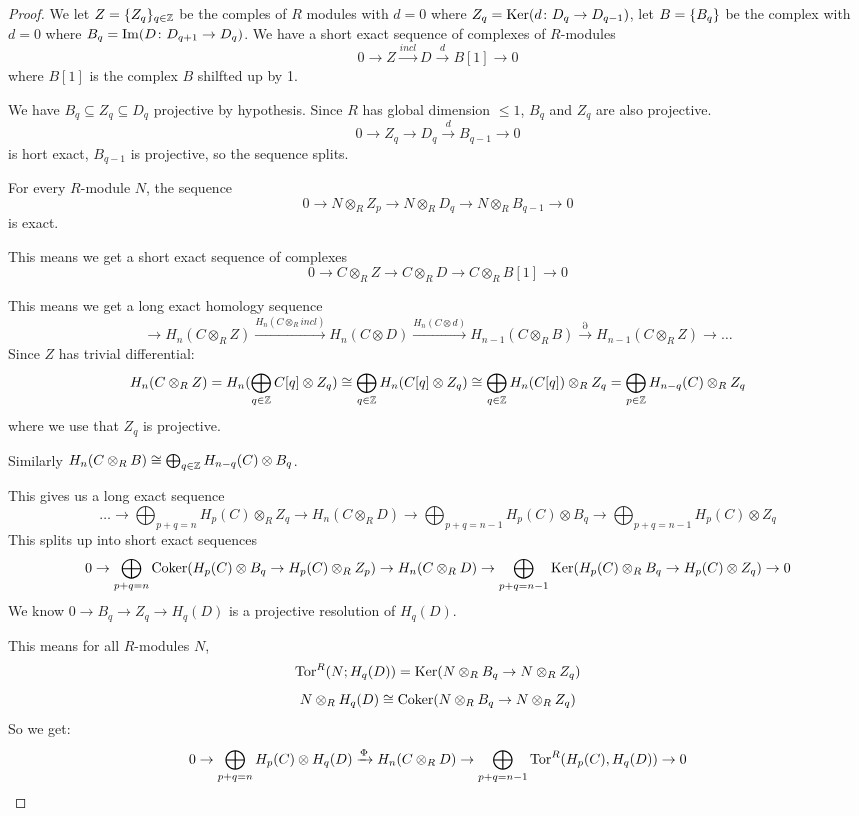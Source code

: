 \documentclass[language=english]{TemplateLecture}
\begin{document}
\begin{proof}
    We let \(Z = \{Z_q\}_{q\in \mathbb{Z}}\) be the comples of \(R\) modules with \(d = 0\) where \(Z_q = \operatorname{Ker}(d\colon D_q \to D_{q-1})\), let \(B = \{B_q\}\) be the complex with \(d = 0\) where \(B_q = \operatorname{Im}(D\colon D_{q+1} \to D_q)\). We have a short exact sequence of complexes of \(R\)-modules
    \[0 \to Z \xrightarrow{incl} D \xrightarrow{d} B[1] \to 0\]
    where \(B[1]\) is the complex \(B\) shilfted up by 1.

    We have \(B_q \subseteq Z_q \subseteq D_q\) projective by hypothesis. Since \(R\) has global dimension \(\leq 1\), \(B_q\) and \(Z_q\) are also projective.
    \[0 \to Z_q \to D_q \xrightarrow{d} B_{q-1} \to 0\]
    is hort exact, \(B_{q-1}\) is projective, so the sequence splits.

    For every \(R\)-module \(N\), the sequence
    \[0 \to N\otimes_R Z_p \to N\otimes_R D_q \to N\otimes_R B_{q-1} \to 0\]
    is exact.

    This means we get a short exact sequence of complexes
    \[0 \to C\otimes_R Z \to C\otimes_R D \to C\otimes_R B[1] \to 0\]

    This means we get a long exact homology sequence
    \[\to H_n(C\otimes_R Z) \xrightarrow{H_n(C\otimes_R incl)} H_n(C\otimes D) \xrightarrow{H_n(C\otimes d)} H_{n-1}(C\otimes_R B) \xrightarrow{\partial} H_{n-1}(C\otimes_R Z) \to \dots\]
    Since \(Z\) has trivial differential:
    \[H_n(C\otimes_R Z) = H_n(\bigoplus_{q \in \mathbb{Z}} C[q] \otimes Z_q) \cong \bigoplus_{q \in \mathbb{Z}} H_n(C[q]\otimes Z_q) \cong \bigoplus_{q \in \mathbb{Z}} H_n(C[q]) \otimes_R Z_q = \bigoplus_{p \in \mathbb{Z}} H_{n-q}(C) \otimes_R Z_q\]
    where we use that \(Z_q\) is projective.

    Similarly \(H_n(C\otimes_R B) \cong \bigoplus_{q\in \mathbb{Z}} H_{n-q}(C) \otimes B_q\).

    This gives us a long exact sequence
    \[\dots \to \bigoplus_{p+q = n} H_p(C) \otimes_R Z_q \to H_n(C\otimes_R D) \to \bigoplus_{p+q = n-1} H_p(C) \otimes B_q \to \bigoplus_{p+q = n-1} H_p(C) \otimes Z_q\]
    This splits up into short exact sequences
    \[0 \to \bigoplus_{p+q = n} \operatorname{Coker}(H_p(C) \otimes B_q \to H_p(C) \otimes_R Z_p) \to H_n(C\otimes_R D) \to \bigoplus_{p+q =n-1} \operatorname{Ker}(H_p(C) \otimes_R B_q \to H_p(C) \otimes Z_q) \to 0\]
    We know \(0 \to B_q \to Z_q \to H_q(D)\) is a projective resolution of \(H_q(D)\).

    This means for all \(R\)-modules \(N\),
    \[\mathrm{Tor}^R(N; H_q(D)) = \operatorname{Ker}(N\otimes_R B_q \to N\otimes_R Z_q)\]
    \[N\otimes_R H_q(D) \cong \operatorname{Coker}(N\otimes_R B_q \to N\otimes_R Z_q)\]
    So we get:
    \[0 \to \bigoplus_{p+q = n} H_p(C) \otimes H_q(D) \xrightarrow{\Phi} H_n(C\otimes_R D) \to \bigoplus_{p+q = n-1} \mathrm{Tor}^R(H_p(C), H_q(D)) \to 0\]


\end{proof}
\end{document}
